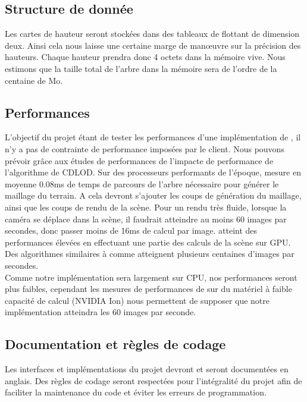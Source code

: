 \documentclass[12pt]{report}
\begin{document}
\subsection{Structure de donnée}

Les cartes de hauteur seront stockées dans des tableaux de flottant de dimension 
deux. Ainsi cela nous laisse une certaine marge de manœuvre sur la précision des 
hauteurs. Chaque hauteur prendra donc 4 octets dans la mémoire vive. Nous estimons 
que la taille total de l'arbre dans la mémoire sera de l'ordre de la
centaine de Mo.\\


\subsection{Performances}

L'objectif du projet étant de tester les performances d'une
implémentation de \cite{CDLOD}, il n'y a pas de contrainte de
performance imposées par le client. Nous pouvons prévoir grâce aux
études de performances de \cite{CDLOD} l'impacte de performance de
l'algorithme de CDLOD. Sur des processeurs performants de l'époque,
\cite{CDLOD} mesure en moyenne 0.08ms de temps de parcours de l'arbre
nécessaire pour générer le maillage du terrain. A cela devront s'ajouter
les coups de génération du maillage, ainsi que les coups de rendu de la
scène.  Pour un rendu très fluide, lorsque la caméra se
déplace dans la scène, il faudrait atteindre au moins 60 images par
secondes, donc passer moins de 16ms de calcul par image. \cite{CDLOD}
atteint des performances élevées en effectuant une partie des calculs de
la scène sur GPU.  Des algorithmes similaires à \cite{CDLOD} comme
\cite{PlanetRenderer} atteignent plusieurs centaines d'images par
secondes.\\
Comme notre implémentation sera largement sur CPU, nos
performances seront plus faibles, cependant les mesures de performances
de \cite{CDLOD} sur du matériel à faible capacité de calcul (NVIDIA Ion)
nous permettent de supposer que notre implémentation atteindra les 60
images par seconde.

\newpage

\subsection{Documentation et règles de codage}

Les interfaces et implémentations du projet devront et seront documentées en anglais. Des règles de codage seront respectées pour l'intégralité du projet afin de faciliter la maintenance du code et éviter les erreurs de programmation.
\end{document}
